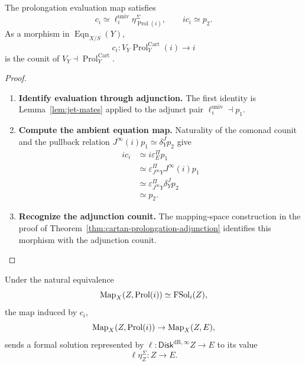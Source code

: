\begin{proposition}
\label{prop:formal-solution-value-map-adjunction-counit}
The prolongation evaluation map satisfies
\[
  c_i\simeq \ell_i^{\mathrm{univ}}\eta^\Sigma_{\operatorname{Prol}(i)},
  \qquad
  ic_i\simeq p_2.
\]
As a morphism in \(\operatorname{Eqn}_{X/S}(Y)\),
\[
  c_i:V_Y\operatorname{Prol}^{\mathrm{Cart}}_Y(i)\longrightarrow i
\]
is the counit of \(V_Y\dashv \operatorname{Prol}^{\mathrm{Cart}}_Y\).
\end{proposition}

\begin{proof}
\leavevmode
\begin{enumerate}[label=\textup{(\arabic*)}]
    \item \textbf{Identify evaluation through adjunction.}
The first identity is Lemma~\ref{lem:jet-mates} applied to the adjunct pair
\(\ell_i^{\mathrm{univ}}\dashv p_1\).

    \item \textbf{Compute the ambient equation map.}
Naturality of the comonad counit and the pullback
relation \(J^\infty(i)p_1\simeq\delta^J_Yp_2\) give
\[
\begin{aligned}
  ic_i
  &\simeq
  i\varepsilon^\Pi_Ep_1\\
  &\simeq
  \varepsilon^\Pi_{J^\infty Y}J^\infty(i)p_1\\
  &\simeq
  \varepsilon^\Pi_{J^\infty Y}\delta^J_Yp_2\\
  &\simeq p_2.
\end{aligned}
\]

    \item \textbf{Recognize the adjunction counit.}
The mapping-space construction in the proof of
Theorem~\ref{thm:cartan-prolongation-adjunction} identifies this morphism with
the adjunction counit.
\end{enumerate}
\end{proof}

\begin{proposition}
\label{prop:formal-solution-value-evaluation}
Under the natural equivalence
\[
  \operatorname{Map}_X(Z,\operatorname{Prol}(i))\simeq\operatorname{FSol}_i(Z),
\]
the map induced by \(c_i\),
\[
  \operatorname{Map}_X(Z,\operatorname{Prol}(i))\to\operatorname{Map}_X(Z,E),
\]
sends a formal solution represented by
\(\ell:\mathsf{Disk}^{\mathrm{dR},\infty} Z\to E\) to its value
\[
  \ell\eta^\Sigma_Z:Z\to E.
\]
\end{proposition}

